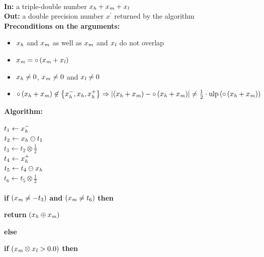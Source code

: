 \begin{algorithm} \label{algarrpres} ~ \\
{\bf In:} a triple-double number $x_{\mathit{h}} + x_{\mathit{m}} + x_{\mathit{l}}$ \\
{\bf Out:} a double precision number $x^\prime$ returned by the algorithm \\
{\bf Preconditions on the arguments:}
\begin{itemize}
\item $x_{\mathit{h}}$ and $x_{\mathit{m}}$ as well as $x_{\mathit{m}}$ and $x_{\mathit{l}}$ do not overlap
\item $x_{\mathit{m}} = \circ \left( x_{\mathit{m}} + x_{\mathit{l}} \right)$
\item $x_{\mathit{h}} \not = 0$, $x_{\mathit{m}} \not = 0$ and $x_{\mathit{l}} \not = 0$  
\item $\circ \left( x_{\mathit{h}} + x_{\mathit{m}} \right) \not \in \left \lbrace x_{\mathit{h}}^-, x_{\mathit{h}}, x_{\mathit{h}}^+ \right \rbrace \Rightarrow 
\left \vert \left( x_{\mathit{h}} + x_{\mathit{m}} \right) - \circ\left( x_{\mathit{h}} + x_{\mathit{m}} \right) \right \vert \not = 
\frac{1}{2} \cdot \mathrm{ulp}\left( \circ \left( x_{\mathit{h}} + x_{\mathit{m}} \right) \right)$
\end{itemize}
{\bf Algorithm:} \\
\begin{center}
\begin{minipage}[b]{80mm}
$t_1 \gets x_{\mathit{h}}^-$ \\
$t_2 \gets x_{\mathit{h}} \ominus t_1$ \\
$t_3 \gets t_2 \otimes \frac{1}{2}$ \\
$t_4 \gets x_{\mathit{h}}^+$ \\
$t_5 \gets t_4 \ominus x_{\mathit{h}}$ \\
$t_6 \gets t_5 \otimes \frac{1}{2}$ 
\\ ~ \\
{\bf if} $\left( x_{\mathit{m}} \not = -t_3 \right)$ {\bf and} $\left( x_{\mathit{m}} \not = t_6 \right)$ {\bf then} 
\vspace{-2.4mm}
\begin{center}
\begin{minipage}[b]{70mm}
\vspace{-2.4mm}
{\bf return } $\left( x_{\mathit{h}} \oplus x_{\mathit{m}} \right)$
\end{minipage}
\end{center}
\vspace{-2.4mm}
{\bf else} 
\vspace{-2.4mm}
\begin{center}
\begin{minipage}[b]{70mm}
{\bf if} $\left( x_{\mathit{m}} \otimes x_{\mathit{l}} > 0.0 \right)$ {\bf then} 

\end{minipage}
\end{center}
\end{minipage}
\end{center}
\end{algorithm}
